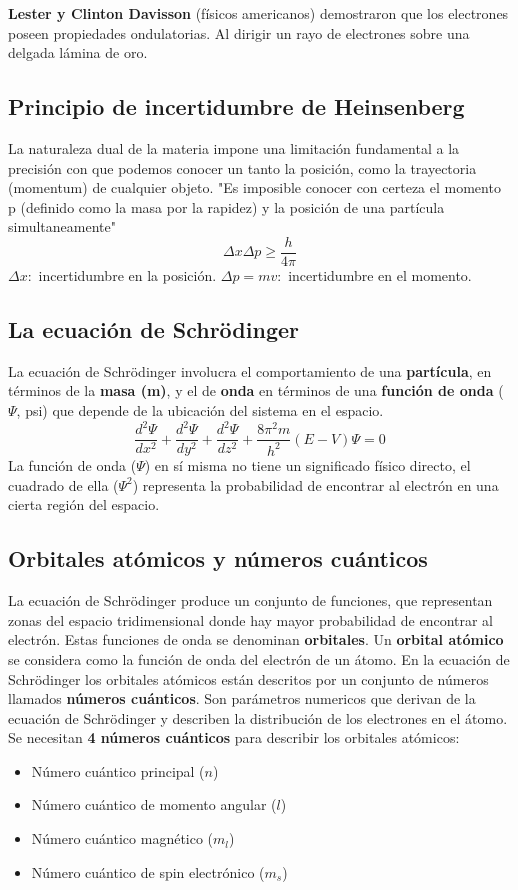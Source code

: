 \documentclass{article}
\begin{document}
\textbf{Lester y Clinton Davisson} (físicos americanos) demostraron que los electrones poseen propiedades ondulatorias. Al dirigir un rayo de electrones sobre una delgada lámina de oro.

\subsection{Principio de incertidumbre de Heinsenberg}
La naturaleza dual de la materia impone una limitación fundamental a la precisión con que podemos conocer un tanto la posición, como la trayectoria (momentum) de cualquier objeto.
"Es imposible conocer con certeza el momento p (definido como la masa por la rapidez) y la posición de una partícula simultaneamente"
\begin{equation}
    \Delta x \Delta p \geq \frac{h}{4\pi}
\end{equation}
$\Delta x:$ incertidumbre en la posición.
$\Delta p=mv:$ incertidumbre en el momento.

\subsection{La ecuación de Schrödinger}
La ecuación de Schrödinger involucra el comportamiento de una \textbf{partícula}, en términos de la \textbf{masa (m)}, y el de \textbf{onda} en términos de una \textbf{función de onda} ($\Psi$, psi) que depende de la ubicación del sistema en el espacio.
\begin{equation}
    \frac{d^2\Psi}{dx^2} + \frac{d^2\Psi}{dy^2} + \frac{d^2\Psi}{dz^2} + \frac{8\pi^2m}{h^2}(E-V)\Psi=0
\end{equation}
La función de onda ($\Psi$) en sí misma no tiene un significado físico directo, el cuadrado de ella ($\Psi^2$) representa la probabilidad de encontrar al electrón en una cierta región del espacio.

\subsection{Orbitales atómicos y números cuánticos}
La ecuación de Schrödinger produce un conjunto de funciones, que representan zonas del espacio tridimensional donde hay mayor probabilidad de encontrar al electrón. Estas funciones de onda se denominan \textbf{orbitales}.
Un \textbf{orbital atómico} se considera como la función de onda del electrón de un átomo.
En la ecuación de Schrödinger los orbitales atómicos están descritos por un conjunto de números llamados \textbf{números cuánticos}.
Son parámetros numericos que derivan de la ecuación de Schrödinger y describen la distribución de los electrones en el átomo.
Se necesitan \textbf{4 números cuánticos} para describir los orbitales atómicos:
\begin{itemize}
    \item Número cuántico principal ($n$)
    \item Número cuántico de momento angular ($l$)
    \item Número cuántico magnético ($m_l$)
    \item Número cuántico de spin electrónico ($m_s$)
\end{itemize}
\end{document}
